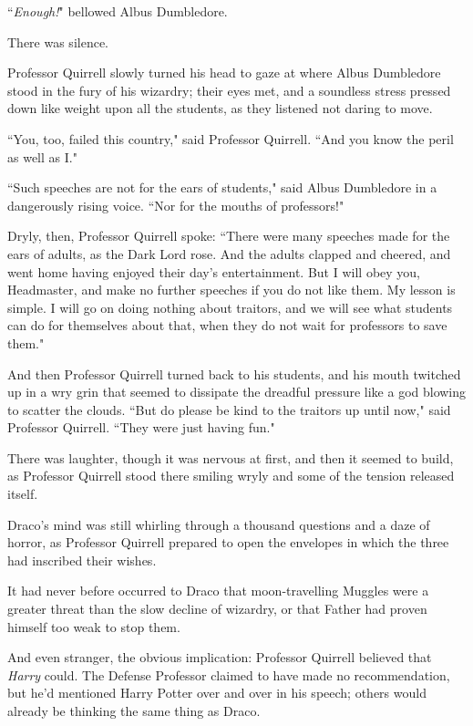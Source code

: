 ``\emph{Enough!}" bellowed Albus Dumbledore.

There was silence.

Professor Quirrell slowly turned his head to gaze at where Albus Dumbledore stood in the fury of his wizardry; their eyes met, and a soundless stress pressed down like weight upon all the students, as they listened not daring to move.

``You, too, failed this country," said Professor Quirrell. ``And you know the peril as well as I."

``Such speeches are not for the ears of students," said Albus Dumbledore in a dangerously rising voice. ``Nor for the mouths of professors!"

Dryly, then, Professor Quirrell spoke: ``There were many speeches made for the ears of adults, as the Dark Lord rose. And the adults clapped and cheered, and went home having enjoyed their day's entertainment. But I will obey you, Headmaster, and make no further speeches if you do not like them. My lesson is simple. I will go on doing nothing about traitors, and we will see what students can do for themselves about that, when they do not wait for professors to save them."

And then Professor Quirrell turned back to his students, and his mouth twitched up in a wry grin that seemed to dissipate the dreadful pressure like a god blowing to scatter the clouds. ``But do please be kind to the traitors up until now," said Professor Quirrell. ``They were just having fun."

There was laughter, though it was nervous at first, and then it seemed to build, as Professor Quirrell stood there smiling wryly and some of the tension released itself.

\later

Draco's mind was still whirling through a thousand questions and a daze of horror, as Professor Quirrell prepared to open the envelopes in which the three had inscribed their wishes.

It had never before occurred to Draco that moon-travelling Muggles were a greater threat than the slow decline of wizardry, or that Father had proven himself too weak to stop them.

And even stranger, the obvious implication: Professor Quirrell believed that \emph{Harry} could. The Defense Professor claimed to have made no recommendation, but he'd mentioned Harry Potter over and over in his speech; others would already be thinking the same thing as Draco.

